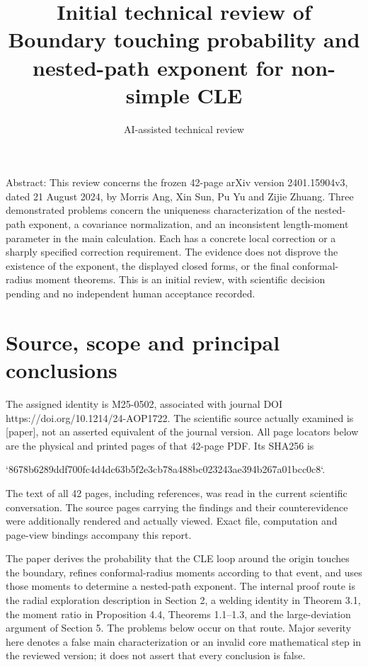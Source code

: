 \documentclass[10pt]{article}
\title{Initial technical review of
Boundary touching probability and nested-path exponent for non-simple CLE}
\author{AI-assisted technical review}
\date{}
\begin{document}
\maketitle
Abstract: This review concerns the frozen 42-page arXiv version 2401.15904v3, dated 21 August 2024, by Morris Ang, Xin Sun, Pu Yu and Zijie Zhuang. Three demonstrated problems concern the uniqueness characterization of the nested-path exponent, a covariance normalization, and an inconsistent length-moment parameter in the main calculation. Each has a concrete local correction or a sharply specified correction requirement. The evidence does not disprove the existence of the exponent, the displayed closed forms, or the final conformal-radius moment theorems. This is an initial review, with scientific decision pending and no independent human acceptance recorded.\par
\section*{Source, scope and principal conclusions}
The assigned identity is M25-0502, associated with journal DOI https://doi.org/10.1214/24-AOP1722. The scientific source actually examined is [paper], not an asserted equivalent of the journal version. All page locators below are the physical and printed pages of that 42-page PDF. Its SHA256 is\par
`8678b6289ddf700fc4d4dc63b5f2e3cb78a488bc023243ae394b267a01bcc0c8`.\par
The text of all 42 pages, including references, was read in the current scientific conversation. The source pages carrying the findings and their counterevidence were additionally rendered and actually viewed. Exact file, computation and page-view bindings accompany this report.\par
The paper derives the probability that the CLE loop around the origin touches the boundary, refines conformal-radius moments according to that event, and uses those moments to determine a nested-path exponent. The internal proof route is the radial exploration description in Section 2, a welding identity in Theorem 3.1, the moment ratio in Proposition 4.4, Theorems 1.1–1.3, and the large-deviation argument of Section 5. The problems below occur on that route. Major severity here denotes a false main characterization or an invalid core mathematical step in the reviewed version; it does not assert that every conclusion is false.\par
\end{document}
